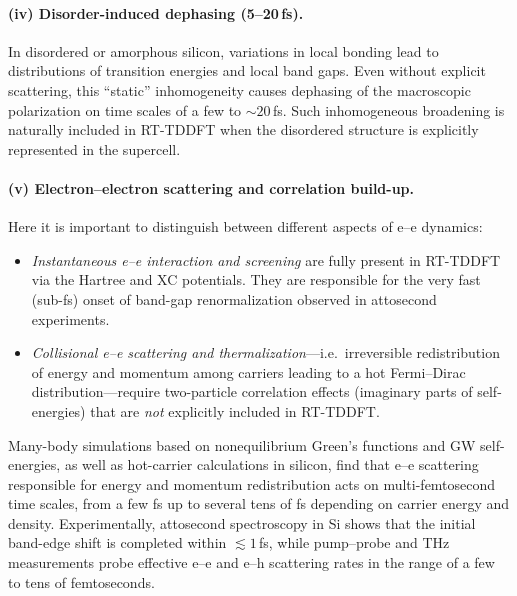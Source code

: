 \paragraph{(iv) Disorder-induced dephasing (5--20\,fs).}
In disordered or amorphous silicon, variations in local bonding lead to distributions of transition energies and local band gaps.
Even without explicit scattering, this ``static'' inhomogeneity causes dephasing of the macroscopic polarization on time scales of a few to $\sim 20$\,fs.\cite{Bondi2010,Dnaya2024,Chopra2022}
Such inhomogeneous broadening is naturally included in RT-TDDFT when the disordered structure is explicitly represented in the supercell.

\paragraph{(v) Electron--electron scattering and correlation build-up.}

Here it is important to distinguish between different aspects of e--e dynamics:

\begin{itemize}
  \item \emph{Instantaneous e--e interaction and screening} are fully present in RT-TDDFT via the Hartree and XC potentials.
        They are responsible for the very fast (sub-fs) onset of band-gap renormalization observed in attosecond experiments.\cite{Schultze2014}

  \item \emph{Collisional e--e scattering and thermalization}---i.e.\ irreversible redistribution of energy and momentum among carriers leading to a hot Fermi--Dirac distribution---require two-particle correlation effects (imaginary parts of self-energies) that are \emph{not} explicitly included in RT-TDDFT.
\end{itemize}

Many-body simulations based on nonequilibrium Green's functions and GW self-energies, as well as hot-carrier calculations in silicon, find that e--e scattering responsible for energy and momentum redistribution acts on multi-femtosecond time scales, from a few fs up to several tens of fs depending on carrier energy and density.\cite{Marini2013,Sangalli2015,Sjakste2025,Bernardi2014}
Experimentally, attosecond spectroscopy in Si shows that the initial band-edge shift is completed within $\lesssim 1$\,fs,\cite{Schultze2014} while pump--probe and THz measurements probe effective e--e and e--h scattering rates in the range of a few to tens of femtoseconds.\cite{Sjakste2025}


